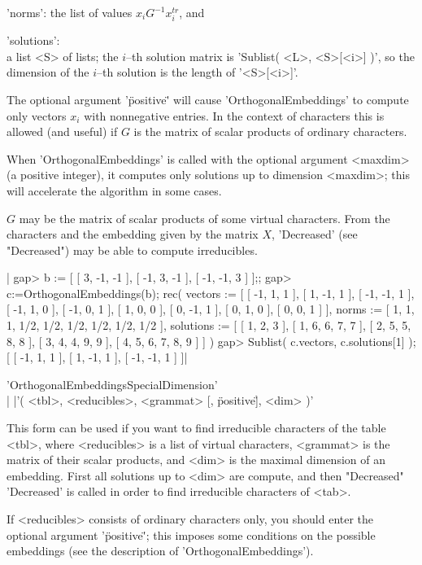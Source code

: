 'norms':     the list of values $x_i G^{-1}x_i^{tr}$, and

'solutions':\\ a list <S> of lists; the $i$--th solution matrix is
              'Sublist( <L>, <S>[<i>] )', so the dimension of the
              $i$--th solution is the length of '<S>[<i>]'.

The optional argument '\"positive\"' will cause 'OrthogonalEmbeddings' to
compute  only vectors $x_i$ with  nonnegative entries.  In the context of
characters  this is allowed  (and useful) if  $G$ is the matrix of scalar
products of ordinary characters.

When 'OrthogonalEmbeddings' is called with the optional argument <maxdim>
(a  positive   integer), it  computes  only solutions   up  to  dimension
<maxdim>; this will accelerate the algorithm in some cases.

$G$ may be  the  matrix of scalar  products of  some  virtual characters.
From   the characters   and   the  embedding given  by  the   matrix $X$,
'Decreased' (see "Decreased") may be able to compute irreducibles.

|    gap> b := [ [  3, -1, -1 ], [ -1,  3, -1 ], [ -1, -1,  3 ] ];;
    gap> c:=OrthogonalEmbeddings(b);
    rec(
      vectors :=
       [ [ -1, 1, 1 ], [ 1, -1, 1 ], [ -1, -1, 1 ], [ -1, 1, 0 ],
          [ -1, 0, 1 ], [ 1, 0, 0 ], [ 0, -1, 1 ], [ 0, 1, 0 ],
          [ 0, 0, 1 ] ],
      norms := [ 1, 1, 1, 1/2, 1/2, 1/2, 1/2, 1/2, 1/2 ],
      solutions := [ [ 1, 2, 3 ], [ 1, 6, 6, 7, 7 ], [ 2, 5, 5, 8, 8 ],
          [ 3, 4, 4, 9, 9 ], [ 4, 5, 6, 7, 8, 9 ] ] )
    gap> Sublist( c.vectors, c.solutions[1] );
    [ [ -1, 1, 1 ], [ 1, -1, 1 ], [ -1, -1, 1 ] ]|

\vspace{5mm}
'OrthogonalEmbeddingsSpecialDimension'%
\\
|          |'( <tbl>, <reducibles>, <grammat> [, \"positive\" ], <dim> )'

This form can be  used if you want  to find irreducible characters of the
table   <tbl>,  where <reducibles> is    a   list of virtual  characters,
<grammat>  is the  matrix   of their scalar  products, and   <dim> is the
maximal dimension of  an embedding.  First  all solutions up to <dim> are
compute,  and  then "Decreased"  'Decreased' is  called  in order to find
irreducible characters of <tab>.

If <reducibles>  consists of ordinary  characters only,  you should enter
the optional argument '\"positive\"'; this imposes some conditions on the
possible embeddings (see the description of 'OrthogonalEmbeddings').

